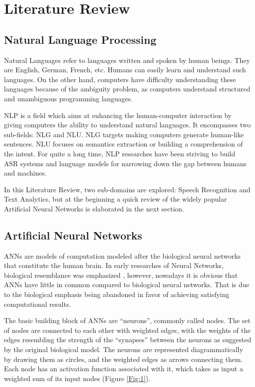 \chapter{Literature Review}
\label{chap:background}

\section{Natural Language Processing} 
\label{bg:s1}


Natural Languages refer to languages written and spoken by human beings. They are English, German, French, etc. Humans can easily learn and understand such languages. On the other hand, computers have difficulty understanding these languages because of the ambiguity problem, as computers understand structured and unambiguous programming languages. 

\ac{NLP} is a field which aims at enhancing the human-computer interaction by giving computers the ability to understand natural languages. It encompasses two sub-fields: \ac{NLG} and \ac{NLU}. \ac{NLG} targets making computers generate human-like sentences. \ac{NLU} focuses on semantics extraction or building a comprehension of the intent. For quite a long time, \ac{NLP} researches have been striving to build \ac{ASR} systems and language models for narrowing down the gap between humans and machines.


In this Literature Review, two sub-domains are explored: Speech Recognition and Text Analytics, but at the beginning a quick review of the widely popular Artificial Neural Networks is elaborated in the next section.



\section{Artificial Neural Networks} \label{bg:s2} 
\ac{ANN}s are models of computation modeled after the biological neural networks that constitute the human brain. 
In early researches of Neural Networks, biological resemblance was emphasized \cite{hopfield1982neural} \cite{jordan1986serial} \cite{elman1990finding}, however, nowadays it is obvious that \ac{ANN}s have little in common compared to biological neural networks. That is due to the biological emphasis being abandoned in favor of achieving satisfying computational results.


The basic building block of \ac{ANN}s are \enquote{neurons}, commonly called nodes. The set of nodes are connected to each other with weighted edges, with the weights of the edges resembling the strength of the \enquote{synapses} between the neurons as suggested by the original biological model. 
The neurons are represented diagrammatically by drawing them as circles, and the weighted edges as arrows connecting them. Each node has an activation function associated with it, which takes as input a weighted sum of its input nodes (Figure \ref{Fig:1}). 

